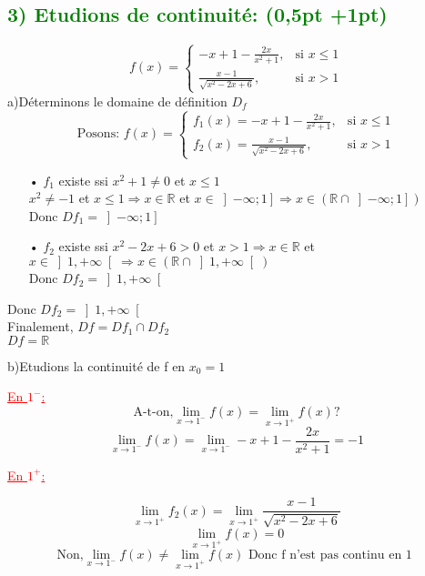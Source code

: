 \documentclass{article}
\begin{document}
\subsection*{\textcolor{green}{3) Etudions de continuité: (0,5pt +1pt)}}
\[ f(x) = \begin{cases} 
  -x+1-\frac{2x}{x^{2}+1}, & \text{si } x \leq 1 \\
  \frac{x-1}{\sqrt{x^{2}-2x+6}}, & \text{si } x > 1
\end{cases} \]
a)Déterminons le domaine de définition $D_{f}$\\
\[\text{Posons: } f(x) = \begin{cases} 
  f_{1}(x)=-x+1-\frac{2x}{x^{2}+1}, & \text{si } x \leq 1 \\
  f_{2}(x)=\frac{x-1}{\sqrt{x^{2}-2x+6}}, & \text{si } x > 1
\end{cases} \]
\begin{itemize}
\item[•] $f_{1}$ existe ssi $x^{2}+1\neq 0$ et $x \leq 1$\\
$x^{2}\neq -1$ et $x \leq 1 \Rightarrow x\in\mathbb{R}$ et $x\in\left] -\infty; 1\right] \Rightarrow x\in\left( \mathbb{R}\cap \left] -\infty; 1\right]\right) $\\
Donc $Df_{1}=\left] -\infty; 1\right]$
\item[•] $f_{2}$ existe ssi $x^{2}-2x+6>0$ et $x > 1 \Rightarrow x\in\mathbb{R}$ et $x\in\left] 1, +\infty \right[\Rightarrow x\in\left(\mathbb{R}\cap\left] 1, +\infty \right[\right)$\\
Donc $Df_{2}=\left] 1, +\infty \right[$
\end{itemize}
Donc $Df_{2}=\left] 1, +\infty \right[$\\
Finalement, $Df=Df_{1}\cap Df_{2}$\\
$Df=\mathbb{R}$

b)Etudions la continuité de f en $x_{0}=1$

\textcolor{red}{\underline{En $1^{-}$:}}
\[\text{A-t-on,} \lim_{x \to 1^{-}}f(x)=\lim_{x \to 1^{+}}f(x)?\]
\[\lim_{x \to 1^{-}}f(x)=\lim_{x \to 1^{-}}-x+1-\frac{2x}{x^{2}+1}=-1\]

\textcolor{red}{\underline{En $1^{+}$:}}

\[\lim_{x \to 1^{+}}f_{2}(x)=\lim_{x \to 1^{+}}\frac{x-1}{\sqrt{x^{2}-2x+6}}\]
\[\lim_{x \to 1^{+}}f(x)=0\]
\[\text{Non,} \lim_{x \to 1^{-}}f(x)\neq\lim_{x \to 1^{+}}f(x) \text{ Donc f n'est pas continu en 1 }\]
\end{document}
